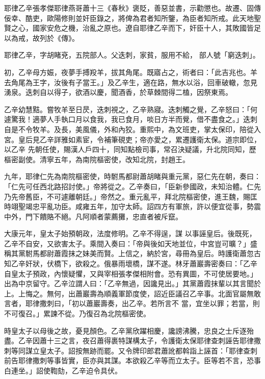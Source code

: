 
\begin{pinyinscope}

 耶律乙辛張孝傑耶律燕哥蕭十三《春秋》褒貶，善惡並書，示勸懲也。故遷、固傳佞幸、酷吏，歐陽修則並奸臣錄之，將俾為君者知所鑒，為臣者知所戒。此天地聖賢之心，國家安危之機，治亂之原也。遼自耶律乙辛而下，奸臣十人，其敗國皆足以為戒，故列於《傳》。



 耶律乙辛，字胡睹兗，五院部人。父迭刺，家貧，服用不給，
 部人號「窮迭刺」。



 初，乙辛母方娠，夜夢手搏羖羊，拔其角尾。既寤占之，術者曰：「此吉兆也。羊去角尾為王字，汝後有子當王。」及乙辛生，適在路，無水以浴，回車破轍，忽見湧泉。迭刺自以得子，欲酒以慶，聞酒香，於草棘間得二榼，因祭東焉。



 乙辛幼慧黠。嘗牧羊至日昃，迭刺視之，乙辛熟寢。迭刺觸之覺，乙辛怒曰：「何遽驚我！適夢人手執口月以食我，我已食月，啖日方半而覺，借不盡食之。」迭刺自是不令牧羊。及長，美風儀，外和內狡。重熙中，為文班吏，掌太保印，陪從入宮。皇后見乙辛詳雅如素宦，令補筆硯吏；帝亦愛之，累遷護衛太保。道宗即位，以乙辛
 先朝任使，賜漢人戶四十，同知點檢司事，常召決疑議，升北院同知，歷樞密副使。清寧五年，為南院樞密使，改知北院，封趙王。



 九年，耶律仁先為南院樞密使，時駙馬都尉蕭胡睹與重元黨，惡仁先在朝，奏曰：「仁先可任西北路招討使。」帝將從之。乙辛奏曰，「臣新參國政，未知治體。仁先乃先帝舊臣，不可遽離朝廷。」帝然之。重元亂平，拜北院樞密使，進王魏，賜匡時翊聖竭忠平亂功臣。咸雍五年，加守太師。詔四方有軍旅，許以便宜從事，勢震中外，門下饋賂不絕。凡阿順者蒙薦攤，忠直者被斥竄。



 大康元年，皇太子始預朝政，法度修明。乙辛不得逞，謀
 以事誣皇后。後既死，乙辛不自安，又欲害太子。乘間入奏曰：「帝與後如天地並位，中宮豈可曠？」盛稱其黨駙馬都尉蕭霞抹之妹美而賢。上信之，納於宮，尋冊為皇后。時護衛蕭忽古知乙辛奸狀，伏橋下，欲殺之。俄暴雨壞橋，謀不遂。林牙蕭巖壽密奏曰：「乙辛自皇太子預政，內懷疑懼，又與宰相張孝傑相附會。恐有異圖，不可使居要地。」出為中京留守。乙辛泣謂人曰：「乙辛無過，因讒見出。」其黨蕭霞抹輩以其言聞於上。上悔之。無何，出蕭巖壽為順義軍節度使，詔近臣議召乙辛事。北面官屬無敢言者，耶律撒刺曰，「初以蕭巖壽奏，出乙辛。若所言不
 當，宜坐以罪；若當，則不可復召。」累諫不從。乃復召為北院樞密使。



 時皇太子以母後之故，憂見顏色。乙辛黨欣躍相慶，讒謗沸騰，忠良之士斥逐殆盡。乙辛因蕭十三之言，夜召蕭得裹特謀構太子，令護衛太保耶律查刺誣告耶律撒刺等同謀立皇太子。詔按無跡而罷。又令牌印郎君蕭訛都斡詣上誣首：「耶律查刺前告耶律撒刺等事皆實，臣亦與其謀。本欲殺乙辛等而立太子。臣等若不言，恐事白連坐。」詔使鞫劾，乙辛迫令具伏。




\end{pinyinscope}
